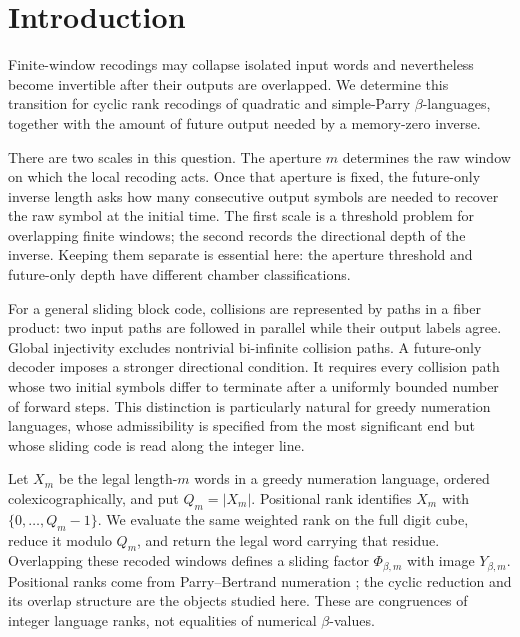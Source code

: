 \section{Introduction}
\label{sec:intro}

Finite-window recodings may collapse isolated input words and nevertheless
become invertible after their outputs are overlapped.  We determine this
transition for cyclic rank recodings of quadratic and simple-Parry
$\beta$-languages, together with the amount of future output needed by a
memory-zero inverse.

There are two scales in this question.  The aperture $m$ determines the raw
window on which the local recoding acts.  Once that aperture is fixed, the
future-only inverse length asks how many consecutive output symbols are
needed to recover the raw symbol at the initial time.  The first scale is a
threshold problem for overlapping finite windows; the second records the
directional depth of the inverse.  Keeping them separate is essential here:
the aperture threshold and future-only depth have different chamber
classifications.

For a general sliding block code, collisions are represented by paths in a
fiber product: two input paths are followed in parallel while their output
labels agree.  Global injectivity excludes nontrivial bi-infinite collision
paths.  A future-only decoder imposes a stronger directional condition.  It
requires every collision path whose two initial symbols differ to terminate
after a uniformly bounded number of forward steps.  This distinction is
particularly natural for greedy numeration languages, whose admissibility is
specified from the most significant end but whose sliding code is read along
the integer line.

Let $X_m$ be the legal length-$m$ words in a greedy numeration language,
ordered colexicographically, and put $Q_m=|X_m|$.  Positional rank identifies
$X_m$ with $\{0,\ldots,Q_m-1\}$.  We evaluate the same weighted rank on the
full digit cube, reduce it modulo $Q_m$, and return the legal word carrying
that residue.  Overlapping these recoded windows defines a sliding factor
$\Phi_{\beta,m}$ with image $Y_{\beta,m}$.  Positional ranks come from
Parry--Bertrand numeration
\cite{BertrandMathis1989,BruyereHansel1997,LecomteRigo2001,
CharlierCisterninoStipulanti2022}; the cyclic reduction and its overlap
structure are the objects studied here.  These are congruences of integer
language ranks, not equalities of numerical $\beta$-values.

